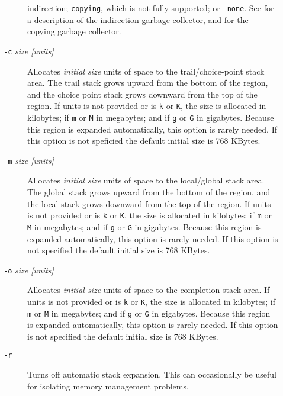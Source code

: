 \begin{description}
\begin{description}
{    indirection}; {\tt copying}, which is not fully supported; or {\tt
    none}. See \cite{CaSC01} for a description of the indirection
  garbage collector, and \cite{CATmem@ISMM-98} for the copying garbage
  collector.
%
\item[{\tt -c} {\em size [units]}] Allocates {\em initial size\/}
  units of space to the trail/choice-point stack area.  The trail
  stack grows upward from the bottom of the region, and the choice
  point stack grows downward from the top of the region.  If units is
  not provided or is {\tt k} or {\tt K}, the size is allocated in
  kilobytes; if {\tt m} or {\tt M} in megabytes; and if {\tt g} or
  {\tt G} in gigabytes.  Because this region is expanded
  automatically, this option is rarely needed.  If this option is not
  speficied the default initial size is 768 KBytes.
%
\item[{\tt -m} {\em size [units]}] Allocates {\em initial size\/}
  units of space to the local/global stack area.  The global stack
  grows upward from the bottom of the region, and the local stack
  grows downward from the top of the region.  If units is not provided
  or is {\tt k} or {\tt K}, the size is allocated in kilobytes; if
  {\tt m} or {\tt M} in megabytes; and if {\tt g} or {\tt G} in
  gigabytes.  Because this region is expanded automatically, this
  option is rarely needed.  If this option is not specified the
  default initial size is 768 KBytes.
%
\item[{\tt -o} {\em size [units]}] Allocates {\em initial size\/}
  units of space to the completion stack area.  If units is not
  provided or is {\tt k} or {\tt K}, the size is allocated in
  kilobytes; if {\tt m} or {\tt M} in megabytes; and if {\tt g} or
  {\tt G} in gigabytes.  Because this region is expanded
  automatically, this option is rarely needed. If this option is not
  specified the default initial size is 768 KBytes.
\item[{\tt -r}] Turns off automatic stack expansion.  This can
  occasionally be useful for isolating memory management problems.
%
%
%
\end{description}
\end{description}

